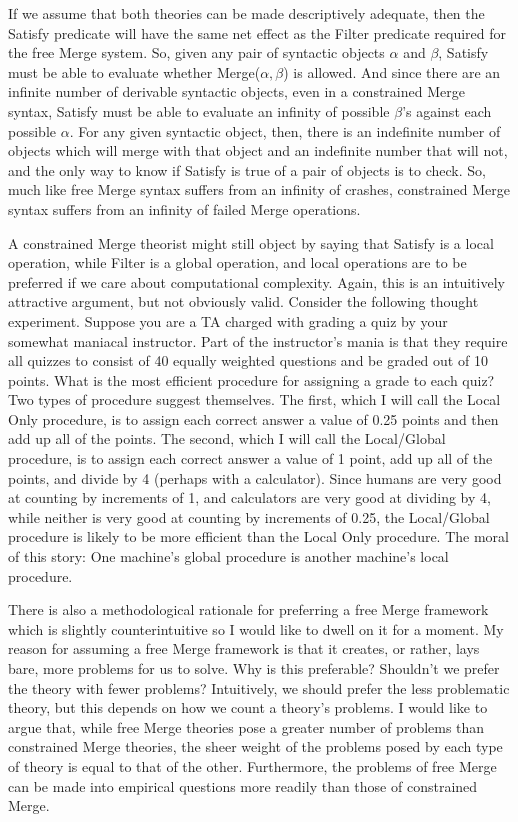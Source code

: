 \documentclass[MilwayThesis]{subfiles}
\begin{document}
If we assume that both theories can be made descriptively adequate, then the Satisfy predicate will have the same net effect as the Filter predicate required for the free Merge system.
So, given any pair of syntactic objects $\alpha$ and $\beta$, Satisfy must be able to evaluate whether Merge($\alpha,\beta$) is allowed.
And since there are an infinite number of derivable syntactic objects, even in a constrained Merge syntax, Satisfy must be able to evaluate an infinity of possible $\beta$'s against each possible $\alpha$.
For any given syntactic object, then, there is an indefinite number of objects which will merge with that object and an indefinite number that will not, and the only way to know if Satisfy is true of a pair of objects is to check.
So, much like free Merge syntax suffers from an infinity of crashes, constrained Merge syntax suffers from an infinity of failed Merge operations.

A constrained Merge theorist might still object by saying that Satisfy is a local operation, while Filter is a global operation, and local operations are to be preferred if we care about computational complexity.
Again, this is an intuitively attractive argument, but not obviously valid.
Consider the following thought experiment.
Suppose you are a TA charged with grading a quiz by your somewhat maniacal instructor.
Part of the instructor's mania is that they require all quizzes to consist of 40 equally weighted questions and be graded out of 10 points.
What is the most efficient procedure for assigning a grade to each quiz?
Two types of procedure suggest themselves.
The first, which I will call the Local Only procedure, is to assign each correct answer a value of 0.25 points and then add up all of the points.
The second, which I will call the Local/Global procedure, is to assign each correct answer a value of 1 point, add up all of the points, and divide by 4 (perhaps with a calculator).
Since humans are very good at counting by increments of 1, and calculators are very good at dividing by 4, while neither is very good at counting by increments of 0.25, the Local/Global procedure is likely to be more efficient than the Local Only procedure.
The moral of this story: One machine's global procedure is another machine's local procedure.

There is also a methodological rationale for preferring a free Merge framework which is slightly counterintuitive so I would like to dwell on it for a moment.
My reason for assuming a free Merge framework is that it creates, or rather, lays bare, more problems for us to solve.
Why is this preferable?
Shouldn't we prefer the theory with fewer problems?
Intuitively, we should prefer the less problematic theory, but this depends on how we count a theory's problems.
I would like to argue that, while free Merge theories pose a greater number of problems than constrained Merge theories, the sheer weight of the problems posed by each type of theory is equal to that of the other.
Furthermore, the problems of free Merge can be made into empirical questions more readily than those of constrained Merge.
\end{document}

